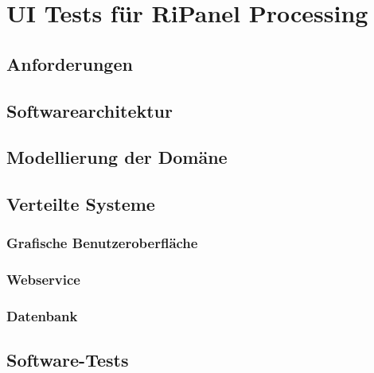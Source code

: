\chapter{UI Tests für RiPanel Processing}
\label{sec:uitests_rpp}

\section{Anforderungen}

\section{Softwarearchitektur}

\section{Modellierung der Domäne}

\section{Verteilte Systeme}

\subsection{Grafische Benutzeroberfläche}

\subsection{Webservice}

\subsection{Datenbank}

\section{Software-Tests}